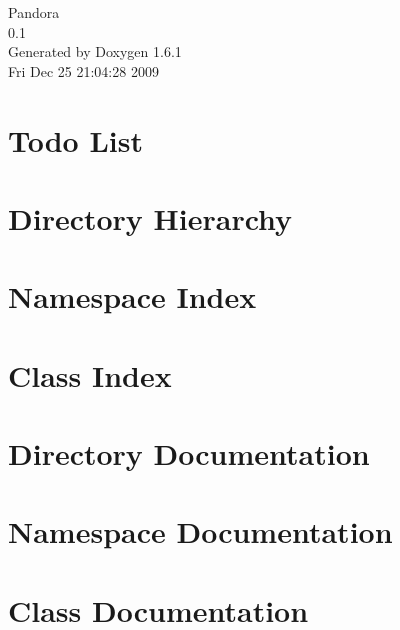 \documentclass[a4paper]{book}
\begin{document}
\hypersetup{pageanchor=false}
\begin{titlepage}
\vspace*{7cm}
\begin{center}
{\Large Pandora \\[1ex]\large 0.1 }\\
\vspace*{1cm}
{\large Generated by Doxygen 1.6.1}\\
\vspace*{0.5cm}
{\small Fri Dec 25 21:04:28 2009}\\
\end{center}
\end{titlepage}
\clearemptydoublepage
{}
\tableofcontents
\clearemptydoublepage
{}
\hypersetup{pageanchor=true}
\chapter{Todo List}
\label{todo}
\hypertarget{todo}{}

\chapter{Directory Hierarchy}

\chapter{Namespace Index}

\chapter{Class Index}

\chapter{Directory Documentation}


\chapter{Namespace Documentation}



\chapter{Class Documentation}









\printindex
\end{document}
